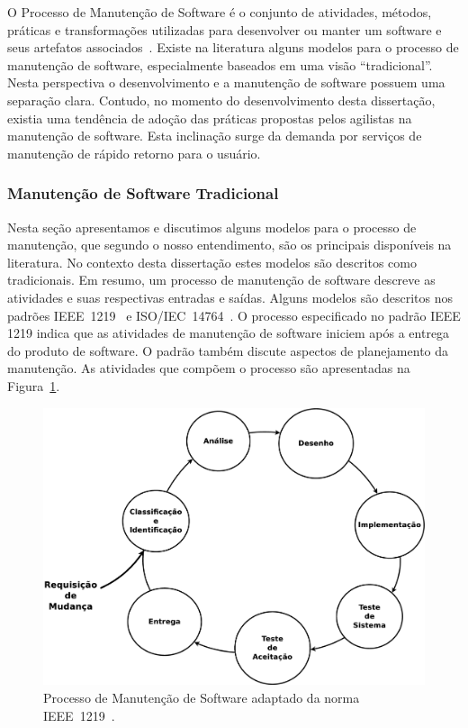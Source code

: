 O Processo de Manutenção de Software é o conjunto de atividades, métodos,
práticas e transformações utilizadas para desenvolver ou manter um software e
seus artefatos associados~\cite{paulk1993key}. Existe na literatura alguns
modelos para o processo de manutenção de software, especialmente baseados em uma
visão ``tradicional''. Nesta perspectiva o desenvolvimento e a manutenção de
software possuem uma separação clara. Contudo, no momento do desenvolvimento
desta dissertação, existia uma tendência de adoção das práticas propostas pelos
agilistas na manutenção de software. Esta inclinação surge da demanda por
serviços de manutenção de rápido retorno para o usuário.


\subsubsection{Manutenção de Software Tradicional}\label{subsec:manutenção_de_software_tradicional}

Nesta seção apresentamos e discutimos alguns modelos para o processo de
manutenção, que segundo o nosso entendimento, são os principais disponíveis na
literatura. No contexto desta dissertação estes modelos são descritos como
tradicionais. Em resumo, um processo de manutenção de software descreve as
atividades e suas respectivas entradas e saídas. Alguns modelos são descritos
nos padrões IEEE~1219~\cite{IEEE1999-Std1219} e
ISO/IEC~14764~\cite{institute2006norma}. O processo especificado no padrão IEEE
1219 indica que as atividades de manutenção de software iniciem após a entrega
do produto de software. O padrão também discute aspectos de planejamento da
manutenção. As atividades que compõem o processo são apresentadas na
Figura~\ref{fig:ieee-1219-processo-man-software}.

\begin{figure}[htpb] \centering
    \includegraphics[width=0.9\linewidth]
    {./chapter-manutencao-software-visao-geral/img/ieee_1219_98_processo_manutencao.eps}
	\caption{Processo de Manutenção de
		Software adaptado da norma IEEE~1219~\cite{IEEE1999-Std1219}.}\label{fig:ieee-1219-processo-man-software}
\end{figure}

